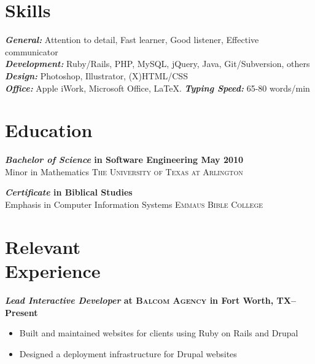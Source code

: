 \documentclass[margin]{res}
\newcommand{\sectionspace}{\vspace{8pt}}
\begin{document}
\begin{resume}

\section{\textsf{Skills}}

                \textbf{\textit{General:}} Attention to detail, Fast learner, Good listener, Effective communicator  \\
                \textbf{\textit{Development:}} Ruby/Rails, PHP, MySQL, jQuery, Java, Git/Subversion, others                \\
                \textbf{\textit{Design:}} Photoshop, Illustrator, (X)HTML/CSS                                       \\
                \textbf{\textit{Office:}} Apple iWork, Microsoft Office, \LaTeX. \textbf{\textit{Typing Speed:}} 65-80 words/min

\sectionspace

\section{\textsf{Education}}

                \textbf{\textit{Bachelor of Science} in Software Engineering \dotfill May 2010 }  \\
                Minor in Mathematics \hfill  \textsc{The University of Texas at Arlington}

                \textbf{\textit{Certificate} in Biblical Studies  } \\
                Emphasis in Computer Information Systems \hfill  \textsc{Emmaus Bible College}

\sectionspace


\section{\textsf{Relevant \\ Experience}}

                \textbf{\textit{Lead Interactive Developer}
         at \textsc{Balcom Agency} in Fort Worth, TX--Present}
         \vspace{-10pt}\begin{itemize} \itemsep -2pt %
           \item Built and maintained websites for clients using Ruby on Rails and Drupal
           \item Designed a deployment infrastructure for Drupal websites
         \end{itemize}


\end{resume}
\end{document}
